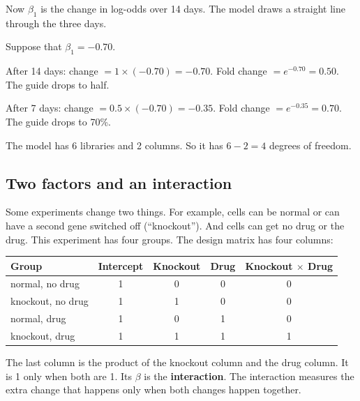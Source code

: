 \documentclass[12pt]{article}
\begin{document}
Now $\beta_1$ is the change in log-odds over 14 days. The model draws a
straight line through the three days.

\begin{worked}
Suppose that $\beta_1 = -0.70$.

After 14 days: change $= 1 \times (-0.70) = -0.70$. Fold change
$= e^{-0.70} = 0.50$. The guide drops to half.

After 7 days: change $= 0.5 \times (-0.70) = -0.35$. Fold change
$= e^{-0.35} = 0.70$. The guide drops to 70\%.

The model has 6 libraries and 2 columns. So it has $6 - 2 = 4$ degrees of
freedom.
\end{worked}

\subsection{Two factors and an interaction}

Some experiments change two things. For example, cells can be normal or can
have a second gene switched off (``knockout''). And cells can get no drug or
the drug. This experiment has four groups. The design matrix has four
columns:

\begin{center}
\begin{tabular}{l|cccc}
\toprule
Group & Intercept & Knockout & Drug & Knockout $\times$ Drug\\
\midrule
normal, no drug   & 1 & 0 & 0 & 0\\
knockout, no drug & 1 & 1 & 0 & 0\\
normal, drug      & 1 & 0 & 1 & 0\\
knockout, drug    & 1 & 1 & 1 & 1\\
\bottomrule
\end{tabular}
\end{center}

The last column is the product of the knockout column and the drug column.
It is 1 only when both are 1. Its $\beta$ is the \textbf{interaction}. The
interaction measures the extra change that happens only when both changes
happen together.
\end{document}

